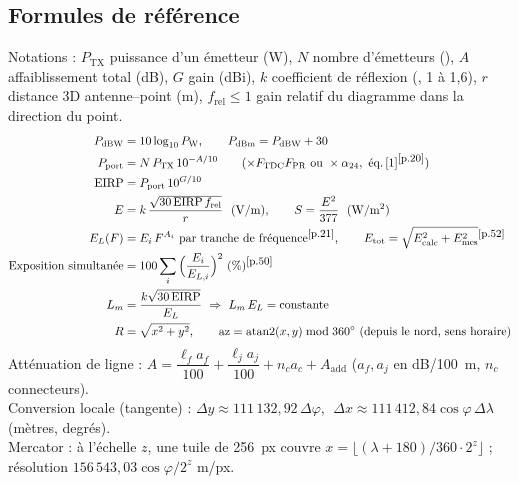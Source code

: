 \subsection{Formules de référence}
Notations : $P_{\mathrm{TX}}$ puissance d'un émetteur (W), $N$ nombre d'émetteurs (), $A$ affaiblissement total (dB), $G$ gain (dBi), $k$ coefficient de réflexion (, 1 à 1,6), $r$ distance 3D antenne--point (m), $f_{\mathrm{rel}}\le1$ gain relatif du diagramme dans la direction du point.
\begin{align}
P_{\mathrm{dBW}}&=10\log_{10}P_{\mathrm W},\qquad P_{\mathrm{dBm}}=P_{\mathrm{dBW}}+30\\
P_{\mathrm{port}}&=N\,P_{\mathrm{TX}}\,10^{-A/10}\qquad(\times F_{\mathrm{TDC}}F_{\mathrm{PR}}\ \text{ou}\ \times\alpha_{24},\ \text{éq.\,[1]}\textsuperscript{\small[p.20]})\\
\mathrm{EIRP}&=P_{\mathrm{port}}\,10^{G/10}\\
E&=k\,\frac{\sqrt{30\,\mathrm{EIRP}\,f_{\mathrm{rel}}}}{r}\ \ (\mathrm{V/m}),\qquad S=\frac{E^2}{377}\ \ (\mathrm{W/m^2})\\
E_L(F)&=E_i\,F^{A_i}\ \text{par tranche de fréquence}\textsuperscript{\small[p.21]},\qquad E_{\mathrm{tot}}=\sqrt{E_{\mathrm{calc}}^2+E_{\mathrm{mes}}^2}\textsuperscript{\small[p.52]}\\
\text{Exposition simultanée}&=100\sum_i\Big(\frac{E_i}{E_{L,i}}\Big)^2\ (\%)\textsuperscript{\small[p.50]}\\
L_{m}&=\frac{k\sqrt{30\,\mathrm{EIRP}}}{E_L}\ \Rightarrow\ L_m\,E_L=\text{constante}\\
R&=\sqrt{x^2+y^2},\qquad \mathrm{az}=\operatorname{atan2}(x,y)\bmod 360^\circ\ \text{(depuis le nord, sens horaire)}
\end{align}
Atténuation de ligne : $A=\dfrac{\ell_f a_f}{100}+\dfrac{\ell_j a_j}{100}+n_c a_c+A_{\mathrm{add}}$ ($a_f,a_j$ en dB/100~m, $n_c$ connecteurs).\\
Conversion locale (tangente) : $\Delta y\approx111\,132{,}92\,\Delta\varphi$, $\;\Delta x\approx111\,412{,}84\cos\varphi\,\Delta\lambda$ (mètres, degrés).\\
Mercator : à l'échelle $z$, une tuile de 256~px couvre $x=\lfloor(\lambda+180)/360\cdot2^z\rfloor$ ; résolution $156\,543{,}03\cos\varphi/2^z$ m/px.

